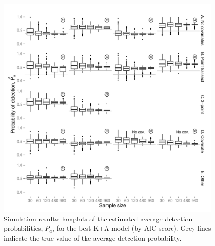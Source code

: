 \documentclass{report}
\begin{document}
\begin{figure}[H]
\centering
\includegraphics[width=\textwidth]{simulations/pa-plot-cds.pdf}
\caption{Simulation results: boxplots of the estimated average detection probabilities, $P_a$, for the best K+A model (by AIC score). Grey lines indicate the true value of the average detection probability.}
\label{sim-boxplots-cds}
\end{figure}
\end{document}
